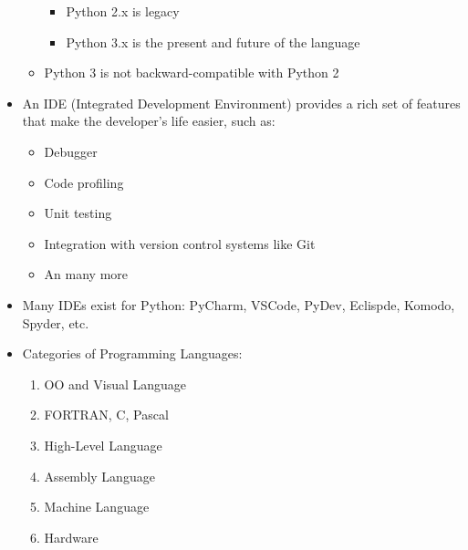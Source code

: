 \begin{itemize}
\begin{itemize}
\begin{itemize}
          \item Python 2.x is legacy

          \item Python 3.x is the present and future of the language

        \end{itemize}

      \item Python 3 is not backward-compatible with Python 2

    \end{itemize}

  \item An IDE (Integrated Development Environment) provides a rich set of features that make the developer's life easier, such as:

    \begin{itemize}

      \item Debugger

      \item Code profiling

      \item Unit testing

      \item Integration with version control systems like Git

      \item An many more

    \end{itemize}

  \item Many IDEs exist for Python: PyCharm, VSCode, PyDev, Eclispde, Komodo, Spyder, etc.

  \item Categories of Programming Languages:

    \begin{enumerate}

      \item OO and Visual Language

      \item FORTRAN, C, Pascal

      \item High-Level Language

      \item Assembly Language

      \item Machine Language

      \item Hardware


\end{enumerate}
\end{itemize}
